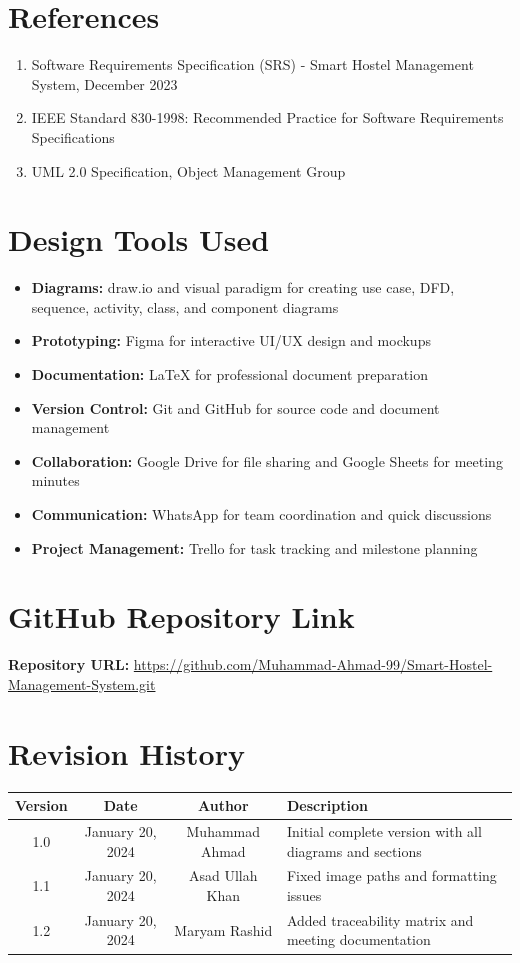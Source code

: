 \documentclass[12pt]{article}
\begin{document}
\section{References}

\begin{enumerate}
    \item Software Requirements Specification (SRS) - Smart Hostel Management System, December 2023
    \item IEEE Standard 830-1998: Recommended Practice for Software Requirements Specifications
    \item UML 2.0 Specification, Object Management Group
\end{enumerate}

\section{Design Tools Used}

\begin{itemize}
\item \textbf{Diagrams:} draw.io and visual paradigm for creating use case, DFD, sequence, activity, class, and component diagrams
\item \textbf{Prototyping:} Figma for interactive UI/UX design and mockups
\item \textbf{Documentation:} LaTeX for professional document preparation
\item \textbf{Version Control:} Git and GitHub for source code and document management
\item \textbf{Collaboration:} Google Drive for file sharing and Google Sheets for meeting minutes
\item \textbf{Communication:} WhatsApp for team coordination and quick discussions
\item \textbf{Project Management:} Trello for task tracking and milestone planning
\end{itemize}

\section{GitHub Repository Link}

\textbf{Repository URL:} \url{https://github.com/Muhammad-Ahmad-99/Smart-Hostel-Management-System.git}

\section{Revision History}

\begin{longtable}{|c|c|c|p{8cm}|}
\hline
\textbf{Version} & \textbf{Date} & \textbf{Author} & \textbf{Description} \\
\hline
1.0 & January 20, 2024 & Muhammad Ahmad & Initial complete version with all diagrams and sections \\
\hline
1.1 & January 20, 2024 & Asad Ullah Khan & Fixed image paths and formatting issues \\
\hline
1.2 & January 20, 2024 & Maryam Rashid & Added traceability matrix and meeting documentation \\
\hline
\end{longtable}
\end{document}
